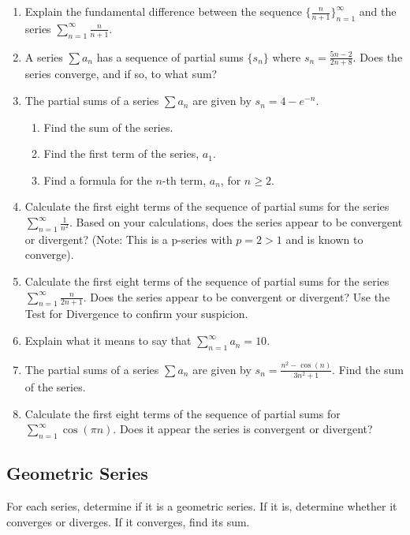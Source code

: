 \documentclass[12pt]{article}
\begin{document}
\begin{enumerate}
    \item Explain the fundamental difference between the sequence $\{ \frac{n}{n+1} \}_{n=1}^\infty$ and the series $\sum_{n=1}^\infty \frac{n}{n+1}$.

    \item A series $\sum a_n$ has a sequence of partial sums $\{s_n\}$ where $s_n = \frac{5n-2}{2n+8}$. Does the series converge, and if so, to what sum?

    \item The partial sums of a series $\sum a_n$ are given by $s_n = 4 - e^{-n}$.
    \begin{enumerate}
        \item Find the sum of the series.
        \item Find the first term of the series, $a_1$.
        \item Find a formula for the $n$-th term, $a_n$, for $n \ge 2$.
    \end{enumerate}

    \item Calculate the first eight terms of the sequence of partial sums for the series $\sum_{n=1}^\infty \frac{1}{n^2}$. Based on your calculations, does the series appear to be convergent or divergent? (Note: This is a p-series with $p=2 > 1$ and is known to converge).

    \item Calculate the first eight terms of the sequence of partial sums for the series $\sum_{n=1}^\infty \frac{n}{2n+1}$. Does the series appear to be convergent or divergent? Use the Test for Divergence to confirm your suspicion.

    \item Explain what it means to say that $\sum_{n=1}^\infty a_n = 10$.

    \item The partial sums of a series $\sum a_n$ are given by $s_n = \frac{n^2 - \cos(n)}{3n^2+1}$. Find the sum of the series.
    
    \item Calculate the first eight terms of the sequence of partial sums for $\sum_{n=1}^\infty \cos(\pi n)$. Does it appear the series is convergent or divergent?

\end{enumerate}

\subsection{Geometric Series}
For each series, determine if it is a geometric series. If it is, determine whether it converges or diverges. If it converges, find its sum.
\end{document}
